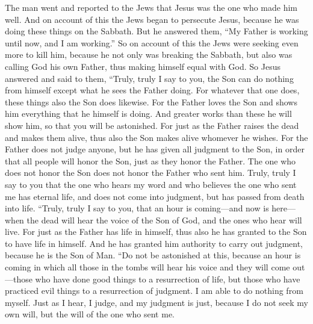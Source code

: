 \begin{biblechapter}
\verse The man went and reported to the Jews that Jesus was the one who made him well.
\verse And on account of this the Jews began to persecute Jesus, because he was doing these things on the Sabbath.
\verse But he answered them, “My Father is working until now, and I am working.”
\verse So on account of this the Jews were seeking even more to kill him, because he not only was breaking the Sabbath, but also was calling God his own Father, thus making himself equal with God.
 So Jesus answered and said to them, “Truly, truly I say to you, the Son can do nothing from himself except what he sees the Father doing. For whatever that one does, these things also the Son does likewise.
\verse For the Father loves the Son and shows him everything that he himself is doing. And greater works than these he will show him, so that you will be astonished.
\verse For just as the Father raises the dead and makes them alive, thus also the Son makes alive whomever he wishes.
\verse For the Father does not judge anyone, but he has given all judgment to the Son,
\verse in order that all people will honor the Son, just as they honor the Father. The one who does not honor the Son does not honor the Father who sent him.
\verse Truly, truly I say to you that the one who hears my word and who believes the one who sent me has eternal life, and does not come into judgment, but has passed from death into life.
\verse “Truly, truly I say to you, that an hour is coming—and now is here—when the dead will hear the voice of the Son of God, and the ones who hear will live.
\verse For just as the Father has life in himself, thus also he has granted to the Son to have life in himself.
\verse And he has granted him authority to carry out judgment, because he is the Son of Man.
\verse “Do not be astonished at this, because an hour is coming in which all those in the tombs will hear his voice
\verse and they will come out—those who have done good things to a resurrection of life, but those who have practiced evil things to a resurrection of judgment.
\verse I am able to do nothing from myself. Just as I hear, I judge, and my judgment is just, because I do not seek my own will, but the will of the one who sent me.

\end{biblechapter}
